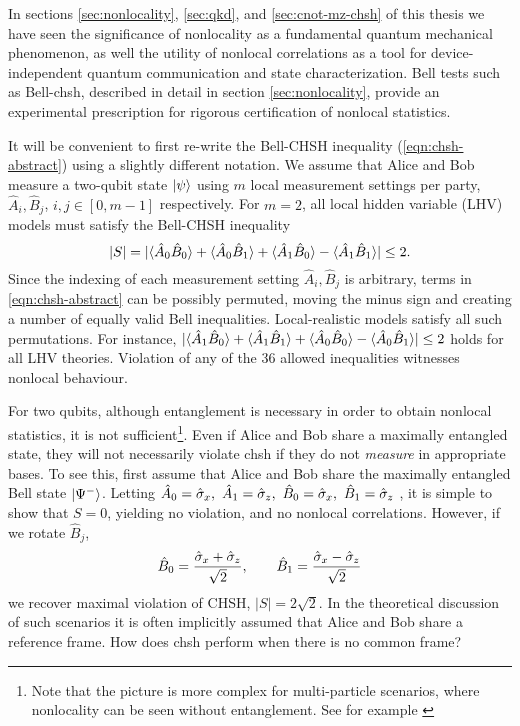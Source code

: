 In sections \ref{sec:nonlocality}, \ref{sec:qkd}, and \ref{sec:cnot-mz-chsh} of this thesis we have seen the significance of nonlocality as a fundamental quantum mechanical phenomenon, as well the utility of nonlocal correlations as a tool for device-independent quantum communication and state characterization.
Bell tests such as Bell-\acrshort{chsh}, described in detail in section \ref{sec:nonlocality}, provide an experimental prescription for rigorous certification of nonlocal statistics. 

It will be convenient to first re-write the Bell-CHSH inequality (\ref{eqn:chsh-abstract}) using a slightly different notation.  We assume that Alice and Bob measure a two-qubit state $\mbox{$ | \psi \rangle $}$ using $m$ local measurement settings per party, $\hat{A}_i, \hat{B}_j$, $i, j \in \left[0, m -1 \right]$ respectively.  For $m=2$, all local hidden variable (LHV) models must satisfy the Bell-CHSH inequality
\begin{equation}
        |S| = |\langle \hat{A}_0 \hat{B}_0 \rangle + 
        \langle \hat{A}_0 \hat{B}_1 \rangle + 
        \langle \hat{A}_1 \hat{B}_0 \rangle - 
        \langle \hat{A}_1 \hat{B}_1 \rangle|
        \le 2.
\label{eqn:chsh-two}
\end{equation}
Since the indexing of each measurement setting $\hat{A}_i, \hat{B}_j$ is arbitrary, terms in \ref{eqn:chsh-abstract} can be possibly permuted, moving the minus sign and creating a number of equally valid Bell inequalities. Local-realistic models satisfy all such permutations. 
For instance, 
       $|\langle \hat{A}_1 \hat{B}_0 \rangle + 
        \langle \hat{A}_1 \hat{B}_1 \rangle + 
        \langle \hat{A}_0 \hat{B}_0 \rangle - 
        \langle \hat{A}_0 \hat{B}_1 \rangle|
        \le 2$
holds for all LHV theories. Violation of any of the 36 allowed inequalities witnesses nonlocal behaviour.

For two qubits, although entanglement is necessary in order to obtain nonlocal statistics, it is not sufficient\footnote{Note that the picture is more complex for multi-particle scenarios, where nonlocality can be seen without entanglement. See for example \cite{Bennett1999b}}. Even if Alice and Bob share a maximally entangled state, they will not necessarily violate \gls{chsh} if they do not \emph{measure} in appropriate bases.  
To see this, first assume that Alice and Bob share the maximally entangled Bell state $\mbox{$ | \Psi^- \rangle $}$. 
Letting 
$\hat{A}_0 = \hat{\sigma}_x,~ \hat{A}_1 = \hat{\sigma}_z,~ \hat{B}_0 = \hat{\sigma}_x,~ \hat{B}_1 = \hat{\sigma}_z$
, it is simple to show that $S = 0$, yielding no violation, and no nonlocal correlations. 
However, if we rotate $\hat{B}_j$,
\begin{equation}
\hat{B}_0 = \frac{ \hat{\sigma}_x + \hat{\sigma}_z }{\sqrt{2}},~~~~~~ \hat{B}_1 = \frac{ \hat{\sigma}_x - \hat{\sigma}_z }{ \sqrt{2}}   
\end{equation}
 we recover maximal violation of CHSH, $|S|=2\sqrt{2}$. In the theoretical discussion of such scenarios it is often implicitly assumed that Alice and Bob share a reference frame. How does \gls{chsh} perform when there is no common frame?

